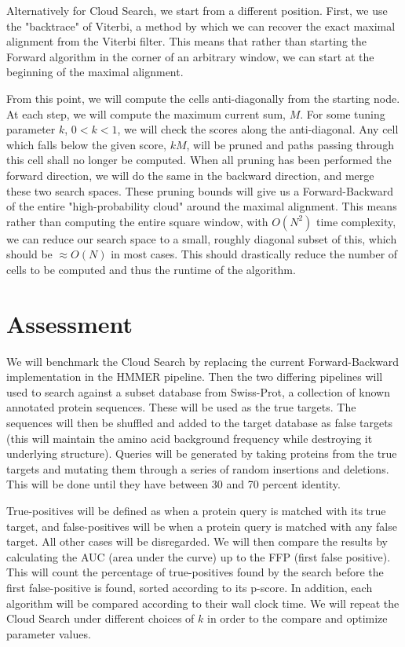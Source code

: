 \documentclass{article}
\begin{document}
	Alternatively for Cloud Search, we start from a different position. First, we use the "backtrace" of Viterbi, a method by which we can recover the exact maximal alignment from the Viterbi filter.  This means that rather than starting the Forward algorithm in the corner of an arbitrary window, we can start at the beginning of the maximal alignment.  
	
	From this point, we will compute the cells anti-diagonally from the starting node.  At each step, we will compute the maximum current sum, $M$.  For some tuning parameter $k$, $0<k<1$, we will check the scores along the anti-diagonal.  Any cell which falls below the given score, $kM$, will be pruned and paths passing through this cell shall no longer be computed.  When all pruning has been performed the forward direction, we will do the same in the backward direction, and merge these two search spaces.  These pruning bounds will give us a Forward-Backward of the entire "high-probability cloud" around the maximal alignment.  This means rather than computing the entire square window, with $O(N^2)$ time complexity, we can reduce our search space to a small, roughly diagonal subset of this, which should be $\approx O(N)$ in most cases.  This should drastically reduce the number of cells to be computed and thus the runtime of the algorithm.  
	
	\section{Assessment}
	
	We will benchmark the Cloud Search by replacing the current Forward-Backward implementation in the HMMER pipeline.  Then the two differing pipelines will used to search against a subset database from Swiss-Prot, a collection of known annotated protein sequences.  These will be used as the true targets.  The sequences will then be shuffled and added to the target database as false targets (this will maintain the amino acid background frequency while destroying it underlying structure).  Queries will be generated by taking proteins from the true targets and mutating them through a series of random insertions and deletions. This will be done until they have between 30 and 70 percent identity.  
	
	True-positives will be defined as when a protein query is matched with its true target, and false-positives will be when a protein query is matched with any false target.  All other cases will be disregarded.  We will then compare the results by calculating the AUC (area under the curve) up to the FFP (first false positive).  This will count the percentage of true-positives found by the search before the first false-positive is found, sorted according to its p-score.  In addition, each algorithm will be compared according to their wall clock time.  We will repeat the Cloud Search under different choices of $k$ in order to the compare and optimize parameter values. 
	
\end{document}
